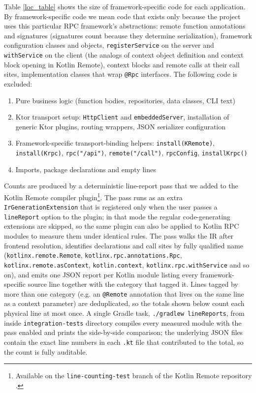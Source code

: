 \documentclass[a4paper,11pt,oneside]{article}
\newcommand{\kotlini}[1]{\texttt{#1}}
\begin{document}
Table \ref{loc_table} shows the size of framework-specific code for each application. By
framework-specific code we mean code that exists only because the project uses this
particular RPC framework's abstractions: remote function annotations and signatures
(signatures count because they determine serialization), framework configuration classes
and objects, \kotlini{registerService} on the server and \kotlini{withService} on the
client (the analogs of context object definition and context block opening in Kotlin
Remote), context blocks and remote calls at their call sites, implementation classes that
wrap \kotlini{@Rpc} interfaces. The following code is excluded:
\begin{enumerate}
	\item Pure business logic (function bodies, repositories, data classes, CLI text)
	\item Ktor transport setup: \kotlini{HttpClient} and \kotlini{embeddedServer}, installation of
	      generic Ktor plugins, routing wrappers, JSON serializer configuration
	\item Framework-specific transport-binding helpers: \kotlini{install(KRemote)}, \kotlini{install(Krpc)},
	      \kotlini{rpc("/api")}, \kotlini{remote("/call")}, \kotlini{rpcConfig}, \kotlini{installKrpc()}
	\item Imports, package declarations and empty lines
\end{enumerate}

Counts are produced by a deterministic line-report pass that we added to the Kotlin
Remote compiler plugin\footnote{Available on the \texttt{line-counting-test} branch of the
Kotlin Remote repository \cite{enotvtapke_kotlin-remote_2026}.}. The pass runs as an
extra \texttt{IrGenerationExtension} that is registered only when the user passes a
\texttt{lineReport} option to the plugin; in that mode the regular code-generating
extensions are skipped, so the same plugin can also be applied to Kotlin RPC modules to
measure them under identical rules. The pass walks the IR after frontend resolution,
identifies declarations and call sites by fully qualified name (\kotlini{kotlinx.remote.Remote},
\kotlini{kotlinx.rpc.annotations.Rpc}, \kotlini{kotlinx.remote.asContext}, \kotlini{kotlin.context},
\kotlini{kotlinx.rpc.withService} and so on), and emits one JSON report per Kotlin module
listing every framework-specific source line together with the category that tagged it.
Lines tagged by more than one category (e.g. an \kotlini{@Remote} annotation that lives on
the same line as a context parameter) are deduplicated, so the totals shown below count
each physical line at most once. A single Gradle task,
\texttt{./gradlew lineReports}, from inside \texttt{integration-tests} directory compiles every measured module with the
pass enabled and prints the side-by-side comparison; the underlying JSON files contain the
exact line numbers in each \texttt{.kt} file that contributed to the total, so the count
is fully auditable.
\end{document}
